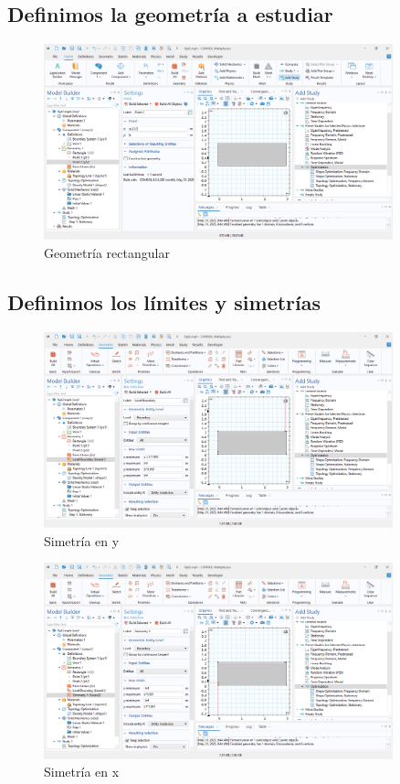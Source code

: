 \documentclass{article}
\theoremstyle{mytheoremstyle}
\theoremstyle{mytheoremstyle}
\theoremstyle{myproblemstyle}
\begin{document}
            \subsection{Definimos la geometría a estudiar}
            \begin{figure}[H]
              \centering
              \includegraphics[width=0.9\textwidth]{Geaometria.png}
              \caption{Geometría rectangular}
              \label{fig:comsol_geometria}
            \end{figure}

            \subsection{Definimos los límites y simetrías}
             \begin{figure}[H]
              \centering
              \includegraphics[width=0.9\textwidth]{Simetryy.png}
              \caption{Simetría en y}
              \label{fig:comsol_simetria_y}
            \end{figure}
              \begin{figure}[H]
              \centering
              \includegraphics[width=0.9\textwidth]{Simetryy2.png}
              \caption{Simetría en x}
              \label{fig:comsol_simetria_x}
            \end{figure}
\end{document}
